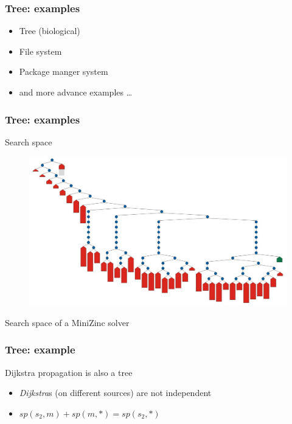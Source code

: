 \documentclass{beamer}
\begin{document}
\begin{frame}
  \frametitle{Tree: examples}
\begin{itemize}
  \item Tree (biological)
  \item File system
  \item Package manger system
  \item and more advance examples \ldots
\end{itemize}
\end{frame}

\begin{frame}
  \frametitle{Tree: examples}
  Search space
  \begin{figure}[]
    \includegraphics[width=.7\textwidth]{./pics/search-tree.jpg} 
  \end{figure}
  \tiny {Search space of a MiniZinc solver}
\end{frame}

\begin{frame}
  \frametitle{Tree: example}
  \begin{minipage}{.6\textwidth}
    Dijkstra propagation is also a tree
    \begin{itemize}
       \item \textit{Dijkstra}s (on different sources) are not independent
       \item $sp(s_2, m) + sp(m, *) = sp(s_2, *)$
    \end{itemize}
    \end{minipage}%
    \begin{minipage}{.4\textwidth}
     \begin{tikzpicture}
        
    \end{tikzpicture}   
    \end{minipage}
\end{frame}
\end{document}
